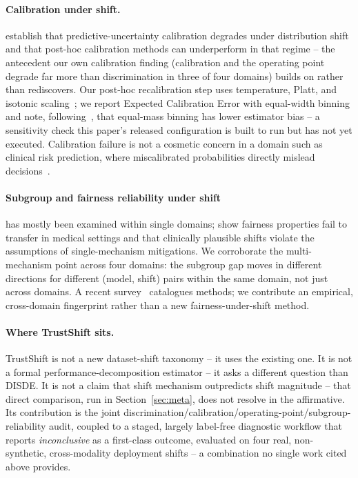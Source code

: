 \documentclass[11pt]{article}
\begin{document}
\paragraph{Calibration under shift.} \citet{ovadia2019trust} establish that predictive-uncertainty
calibration degrades under distribution shift and that post-hoc calibration methods can underperform
in that regime -- the antecedent our own calibration finding (calibration and the operating point
degrade far more than discrimination in three of four domains) builds on rather than rediscovers.
Our post-hoc recalibration step uses temperature, Platt, and isotonic
scaling~\citep{guo2017calibration,zadrozny2002isotonic}; we report Expected Calibration Error with
equal-width binning and note, following~\citet{roelofs2022mitigating}, that equal-mass binning has
lower estimator bias -- a sensitivity check this paper's released configuration is built to run but
has not yet executed. Calibration failure is not a cosmetic concern in a domain such as clinical
risk prediction, where miscalibrated probabilities directly mislead
decisions~\citep{vancalster2019achilles}.

\paragraph{Subgroup and fairness reliability under shift} has mostly been examined within single
domains; \citet{schrouff2022diagnosing} show fairness properties fail to transfer in medical
settings and that clinically plausible shifts violate the assumptions of single-mechanism
mitigations. We corroborate the multi-mechanism point across four domains: the subgroup gap moves
in different directions for different (model, shift) pairs within the same domain, not just across
domains. A recent survey~\citep{lin2024fairnessshiftsurvey} catalogues methods; we contribute an
empirical, cross-domain fingerprint rather than a new fairness-under-shift method.

\paragraph{Where TrustShift sits.} TrustShift is not a new dataset-shift taxonomy -- it uses the
existing one. It is not a formal performance-decomposition estimator -- it asks a different
question than DISDE. It is not a claim that shift mechanism outpredicts shift magnitude -- that
direct comparison, run in Section~\ref{sec:meta}, does not resolve in the affirmative. Its
contribution is the joint discrimination/calibration/operating-point/subgroup-reliability audit,
coupled to a staged, largely label-free diagnostic workflow that reports \emph{inconclusive} as a
first-class outcome, evaluated on four real, non-synthetic, cross-modality deployment shifts -- a
combination no single work cited above provides.
\end{document}
